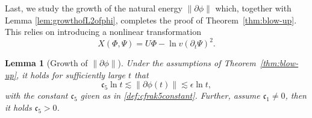 \documentclass[a4paper,reqno]{amsart}
\newtheorem{lemma}[theorem]{Lemma}
\theoremstyle{definition}
\numberwithin{equation}{section}
\def\cfrak{\mathfrak{c}}
\begin{document}
Last, we study the growth of the natural energy $\|\partial \phi\|$ which, together with Lemma \ref{lem:growthofL2ofphi}, completes the proof of Theorem~\ref{thm:blow-up}. This relies on introducing a nonlinear transformation 
\begin{equation}\label{def:Xnon-transform}
X(\Phi, \Psi) = U\Phi - \ln v (\partial_t \Psi)^2.
\end{equation}

\begin{lemma}[Growth of $\|\partial \phi\|$]\label{prop:growthofprphi}
   Under the assumptions of Theorem~\ref{thm:blow-up},  it holds for sufficiently large $t$ that
    \begin{equation}\label{eq:growthofpartialphi}
        \mathfrak{c}_{5}\ln t\lesssim \|\partial \phi(t)\|\lesssim \epsilon \ln t,
    \end{equation}
    with the constant $\cfrak_5$ given as in \eqref{def:cfrak5constant}. Further, assume $\cfrak_1\neq 0$, then it holds $\cfrak_5>0$.
\end{lemma}
\end{document}
